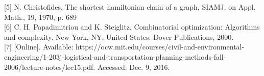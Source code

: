\documentclass[12pt, oneside]{article}   	%
\begin{document}
[5] N. Christofides, The shortest hamiltonian chain of a graph, SIAMJ. on Appl. Math., 19, 1970, p. 689\\ 

[6]	C. H. Papadimitriou and K. Steiglitz, Combinatorial optimization: Algorithms and complexity. New York, NY, United States: Dover Publications, 2000.\\

[7]	[Online]. Available: https://ocw.mit.edu/courses/civil-and-environmental-engineering/1-203j-logistical-and-transportation-planning-methods-fall-2006/lecture-notes/lec15.pdf. Accessed: Dec. 9, 2016.
\end{document}
